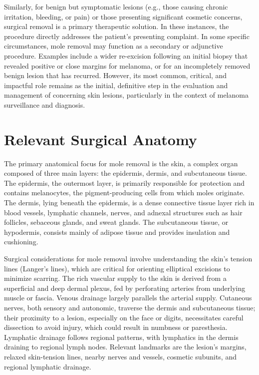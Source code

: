 Similarly, for benign but symptomatic lesions (e.g., those causing chronic irritation, bleeding, or pain) or those presenting significant cosmetic concerns, surgical removal is a primary therapeutic solution. In these instances, the procedure directly addresses the patient's presenting complaint. In some specific circumstances, mole removal may function as a secondary or adjunctive procedure. Examples include a wider re-excision following an initial biopsy that revealed positive or close margins for melanoma, or for an incompletely removed benign lesion that has recurred. However, its most common, critical, and impactful role remains as the initial, definitive step in the evaluation and management of concerning skin lesions, particularly in the context of melanoma surveillance and diagnosis.

\section*{Relevant Surgical Anatomy}
The primary anatomical focus for mole removal is the skin, a complex organ composed of three main layers: the epidermis, dermis, and subcutaneous tissue. The epidermis, the outermost layer, is primarily responsible for protection and contains melanocytes, the pigment-producing cells from which moles originate. The dermis, lying beneath the epidermis, is a dense connective tissue layer rich in blood vessels, lymphatic channels, nerves, and adnexal structures such as hair follicles, sebaceous glands, and sweat glands. The subcutaneous tissue, or hypodermis, consists mainly of adipose tissue and provides insulation and cushioning.

Surgical considerations for mole removal involve understanding the skin's tension lines (Langer's lines), which are critical for orienting elliptical excisions to minimize scarring. The rich vascular supply to the skin is derived from a superficial and deep dermal plexus, fed by perforating arteries from underlying muscle or fascia. Venous drainage largely parallels the arterial supply. Cutaneous nerves, both sensory and autonomic, traverse the dermis and subcutaneous tissue; their proximity to a lesion, especially on the face or digits, necessitates careful dissection to avoid injury, which could result in numbness or paresthesia. Lymphatic drainage follows regional patterns, with lymphatics in the dermis draining to regional lymph nodes. Relevant landmarks are the lesion's margins, relaxed skin-tension lines, nearby nerves and vessels, cosmetic subunits, and regional lymphatic drainage.

